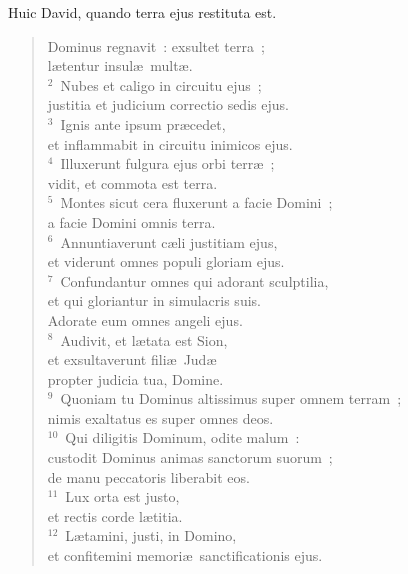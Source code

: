 \lettrine[lines=3,image=true,loversize=0.05,lraise=-0.03]{H}{}uic David, quando terra ejus restituta est. \begin{flushleft}\begin{verse}\vspace{6pt}Dominus regnavit~: exsultet terra~;\\ l\ae tentur insul\ae\ mult\ae .\\
${}^{2}$~Nubes et caligo in circuitu ejus~;\\ justitia et judicium correctio sedis ejus.\\
${}^{3}$~Ignis ante ipsum pr\ae cedet,\\ et inflammabit in circuitu inimicos ejus.\\
${}^{4}$~Illuxerunt fulgura ejus orbi terr\ae~;\\ vidit, et commota est terra.\\
${}^{5}$~Montes sicut cera fluxerunt a facie Domini~;\\ a facie Domini omnis terra.\\
${}^{6}$~Annuntiaverunt c\ae li justitiam ejus,\\ et viderunt omnes populi gloriam ejus.\\
${}^{7}$~Confundantur omnes qui adorant sculptilia,\\ et qui gloriantur in simulacris suis.\\ Adorate eum omnes angeli ejus.\\
${}^{8}$~Audivit, et l\ae tata est Sion,\\ et exsultaverunt fili\ae\ Jud\ae \\ propter judicia tua, Domine.\\
${}^{9}$~Quoniam tu Dominus altissimus super omnem terram~;\\ nimis exaltatus es super omnes deos.\\
${}^{10}$~Qui diligitis Dominum, odite malum~:\\ custodit Dominus animas sanctorum suorum~;\\ de manu peccatoris liberabit eos.\\
${}^{11}$~Lux orta est justo,\\ et rectis corde l\ae titia.\\
${}^{12}$~L\ae tamini, justi, in Domino,\\ et confitemini memori\ae\ sanctificationis ejus.\end{verse}\end{flushleft}



